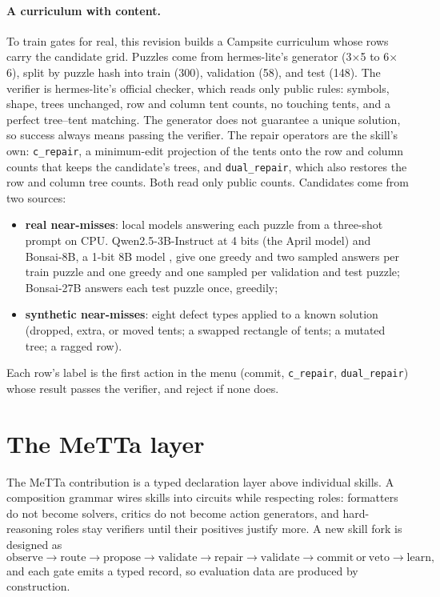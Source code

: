 \documentclass[11pt]{article}
\begin{document}
\paragraph{A curriculum with content.} To train gates for real, this revision builds a Campsite curriculum whose rows carry the candidate grid. Puzzles come from hermes-lite's generator (3$\times$5 to 6$\times$6), split by puzzle hash into train (300), validation (58), and test (148). The verifier is hermes-lite's official checker, which reads only public rules: symbols, shape, trees unchanged, row and column tent counts, no touching tents, and a perfect tree--tent matching. The generator does not guarantee a unique solution, so success always means passing the verifier. The repair operators are the skill's own: \texttt{c\_repair}, a minimum-edit projection of the tents onto the row and column counts that keeps the candidate's trees, and \texttt{dual\_repair}, which also restores the row and column tree counts. Both read only public counts. Candidates come from two sources:
\begin{itemize}[leftmargin=*]
  \item \textbf{real near-misses}: local models answering each puzzle from a three-shot prompt on CPU. Qwen2.5-3B-Instruct at 4 bits (the April model) and Bonsai-8B, a 1-bit 8B model \citep{prismml2026bonsai}, give one greedy and two sampled answers per train puzzle and one greedy and one sampled per validation and test puzzle; Bonsai-27B answers each test puzzle once, greedily;
  \item \textbf{synthetic near-misses}: eight defect types applied to a known solution (dropped, extra, or moved tents; a swapped rectangle of tents; a mutated tree; a ragged row).
\end{itemize}
Each row's label is the first action in the menu (commit, \texttt{c\_repair}, \texttt{dual\_repair}) whose result passes the verifier, and reject if none does.

\section{The MeTTa layer}
\label{sec:metta}

The MeTTa contribution is a typed declaration layer above individual skills. A composition grammar wires skills into circuits while respecting roles: formatters do not become solvers, critics do not become action generators, and hard-reasoning roles stay verifiers until their positives justify more. A new skill fork is designed as
\[
\mathrm{observe} \rightarrow \mathrm{route} \rightarrow \mathrm{propose} \rightarrow \mathrm{validate} \rightarrow \mathrm{repair} \rightarrow \mathrm{validate} \rightarrow \mathrm{commit\ or\ veto} \rightarrow \mathrm{learn},
\]
and each gate emits a typed record, so evaluation data are produced by construction.
\end{document}
